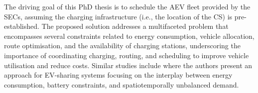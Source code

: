 The driving goal of this PhD thesis is to schedule the AEV fleet provided by the SECs, assuming the charging infrastructure (i.e., the location of the CS) is pre-established. The proposed solution addresses a multifaceted problem that encompasses several constraints related to energy consumption, vehicle allocation, route optimisation, and the availability of charging stations, underscoring
the importance of coordinating charging, routing, and scheduling to improve vehicle utilisation and reduce costs. Similar studies include \cite{lu2021optimal, lai2020optimal} where the authors present an approach for EV-sharing systems focusing on the interplay between energy consumption, battery constraints, and spatiotemporally unbalanced demand. 








